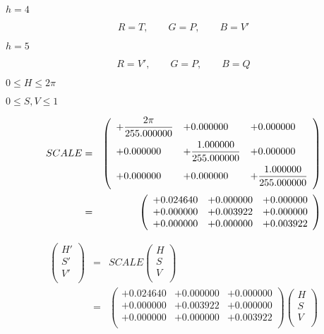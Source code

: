\documentclass{article}
\begin{document}
$h=4$
\pagebreak

\[ R = T,\qquad G = P,\qquad B = V' \]
\pagebreak

$h=5$
\pagebreak

\[ R = V',\qquad G = P,\qquad B = Q \]
\pagebreak

$ 0 \le H \le 2\pi $
\pagebreak

$ 0 \le S, V \le 1 $
\pagebreak

\begin{eqnarray*} SCALE &=& \left( \begin{array}{lll} +\dfrac{2\pi}{255.000000} & +0.000000 & +0.000000 \vspace{.5em} \\ +0.000000 & +\dfrac{1.000000}{255.000000} & +0.000000 \vspace{.5em} \\ +0.000000 & +0.000000 & +\dfrac{1.000000}{255.000000} \vspace{.5em} \\ \end{array} \right) \\ &=& \left( \begin{array}{lll} +0.024640 & +0.000000 & +0.000000 \\ +0.000000 & +0.003922 & +0.000000 \\ +0.000000 & +0.000000 & +0.003922 \\ \end{array} \right) \\ \end{eqnarray*}
\pagebreak

\begin{eqnarray*} \left( \begin{array}{l} H' \\ S' \\ V' \\ \end{array} \right) &=& SCALE \left( \begin{array}{l} H \\ S \\ V \\ \end{array} \right) \\ &=& \left( \begin{array}{lll} +0.024640 & +0.000000 & +0.000000 \\ +0.000000 & +0.003922 & +0.000000 \\ +0.000000 & +0.000000 & +0.003922 \\ \end{array} \right) \left( \begin{array}{l} H \\ S \\ V \\ \end{array} \right) \\ \end{eqnarray*}
\pagebreak
\end{document}
